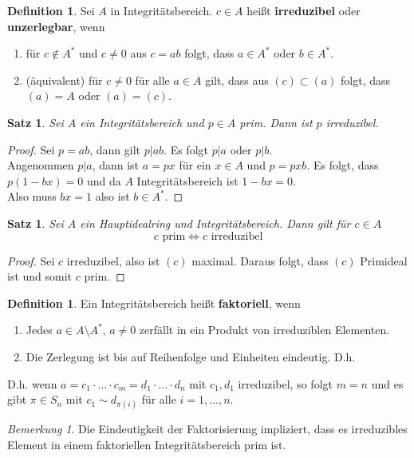\documentclass[10pt,a4paper]{article}
\theoremstyle{plain}
\newtheorem{satz}[theorem]{Satz}
\theoremstyle{definition}
\newtheorem{definition}[theorem]{Definition}
\theoremstyle{remark}
\newtheorem{bem}[theorem]{Bemerkung}
\begin{document}
	\begin{definition}
		Sei $A$ in Integritätsbereich. $c\in A$ heißt \textbf{irreduzibel} oder \textbf{unzerlegbar}, wenn
		\begin{enumerate}
			\item für $c\notin A^*$ und $c\neq 0$ aus $c=ab$ folgt, dass $a\in A^*$ oder $b\in A^*$.
			\item (äquivalent) für $c\neq 0$ für alle $a\in A$ gilt, dass aus $(c)\subset(a)$ folgt, dass $(a)=A$ oder $(a)=(c)$.
		\end{enumerate}
	\end{definition}

	\begin{satz}
		Sei $A$ ein Integritätsbereich und $p\in A$ prim. Dann ist $p$ irreduzibel.
	\end{satz}
	\begin{proof}
		Sei $p=ab$, dann gilt $p|ab$. Es folgt $p|a$ oder $p|b$.\\
		Angenommen $p|a$, dann ist $a=px$ für ein $x\in A$ und $p=pxb$. Es folgt, dass $p(1-bx)=0$ und da $A$ Integritätsbereich ist $1-bx=0$.\\
		Also muss $bx=1$ also ist $b\in A^*$.
	\end{proof}

	\begin{satz}
		Sei $A$ ein Hauptidealring und Integritätsbereich. Dann gilt für $c\in A$
		\[\text{$c$ prim}\Leftrightarrow\text{$c$ irreduzibel}\]
	\end{satz}
	\begin{proof}
		Sei $c$ irreduzibel, also ist $(c)$ maximal. Daraus folgt, dass $(c)$ Primideal ist und somit $c$ prim.
	\end{proof}

	\begin{definition}
		Ein Integritätsbereich heißt \textbf{faktoriell}, wenn
		\begin{enumerate}
			\item Jedes $a\in A\setminus A^*$, $a\neq 0$ zerfällt in ein Produkt von irreduziblen Elementen.
			\item Die Zerlegung ist bis auf Reihenfolge und Einheiten eindeutig. D.h.
		\end{enumerate}
		D.h. wenn $a=c_1\cdot ...\cdot c_m=d_1\cdot...\cdot d_n$ mit $c_1,d_1$ irreduzibel, so folgt $m=n$ und es gibt $\pi\in S_n$ mit $c_1\sim d_{\pi(i)}$ für alle $i=1,...,n$.
	\end{definition}

	\begin{bem}
		Die Eindeutigkeit der Faktorisierung impliziert, dass es irreduzibles Element in einem faktoriellen Integritätsbereich prim ist.
	\end{bem}
\end{document}
